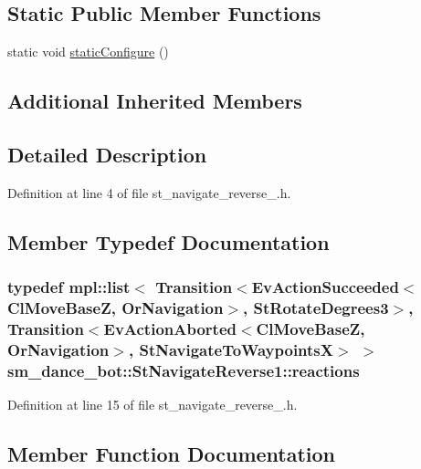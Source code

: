 \subsection*{Static Public Member Functions}
\begin{DoxyCompactItemize}
\item 
static void \hyperlink{structsm__dance__bot_1_1StNavigateReverse1_a27ad6ec4e54e4b4acc676fdb3948849e}{static\+Configure} ()
\end{DoxyCompactItemize}
\subsection*{Additional Inherited Members}


\subsection{Detailed Description}


Definition at line 4 of file st\+\_\+navigate\+\_\+reverse\+\_.\+h.



\subsection{Member Typedef Documentation}
\subsubsection[{\texorpdfstring{reactions}{reactions}}]{\setlength{\rightskip}{0pt plus 5cm}typedef mpl\+::list$<$ Transition$<$Ev\+Action\+Succeeded$<${\bf Cl\+Move\+BaseZ}, {\bf Or\+Navigation}$>$, {\bf St\+Rotate\+Degrees3}$>$, Transition$<$Ev\+Action\+Aborted$<${\bf Cl\+Move\+BaseZ}, {\bf Or\+Navigation}$>$, {\bf St\+Navigate\+To\+WaypointsX}$>$ $>$ {\bf sm\+\_\+dance\+\_\+bot\+::\+St\+Navigate\+Reverse1\+::reactions}}\hypertarget{structsm__dance__bot_1_1StNavigateReverse1_ab71f3a9d0c89ec34654dbffdcbc61c67}{}\label{structsm__dance__bot_1_1StNavigateReverse1_ab71f3a9d0c89ec34654dbffdcbc61c67}


Definition at line 15 of file st\+\_\+navigate\+\_\+reverse\+\_.\+h.



\subsection{Member Function Documentation}
